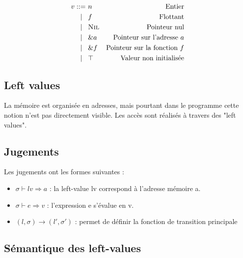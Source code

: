 \begin{align*}
v  ::=~  & n           & \textrm{Entier}
\\ |\hspace{3mm}   & f           & \textrm{Flottant}
\\ |\hspace{3mm}   & \textsc{Nil}       & \textrm{Pointeur nul}
\\ |\hspace{3mm}   & \&a         & \textrm{Pointeur sur l'adresse $a$}
\\ |\hspace{3mm}   & \&f         & \textrm{Pointeur sur la fonction $f$}
\\ |\hspace{3mm}   & \top        & \textrm{Valeur non initialisée}
\end{align*}


\subsection{Left values}

La mémoire est organisée en adresses, mais pourtant dans le programme cette
notion n'est pas directement visible. Les accès sont réalisés à travers des
"left values".

\subsection{Jugements}

Les jugements ont les formes suivantes :

\begin{itemize}

\item $σ ⊢ lv ⇒ a$ :
  la left-value lv correspond à l'adresse mémoire a.

\item $σ ⊢ e ⇒ v$ :
  l'expression e s'évalue en v.

\item $(l, σ) \rightarrow (l', σ')$ :
  permet de définir la fonction de transition principale

\end{itemize}

\subsection{Sémantique des left-values}


